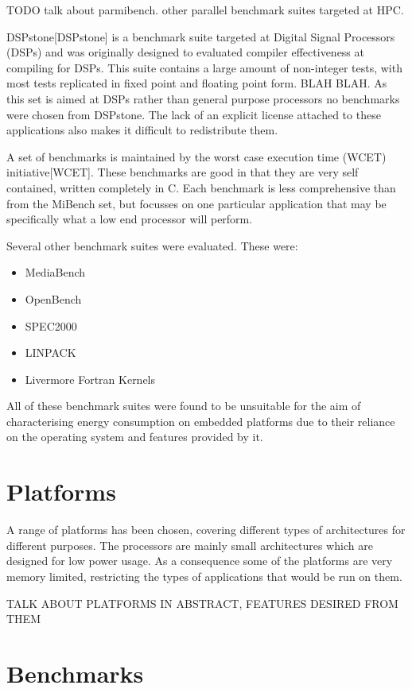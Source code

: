 \documentclass[twocolumn]{article}
\begin{document}
TODO talk about parmibench. other parallel
benchmark suites targeted at HPC.

DSPstone[DSPstone] is a benchmark suite targeted at Digital Signal Processors (DSPs) and was originally designed to evaluated compiler effectiveness at compiling for DSPs. This suite contains a large amount of non-integer tests, with most tests replicated in fixed point and floating point form. BLAH BLAH. As this set is aimed at DSPs rather than general purpose processors no benchmarks were chosen from DSPstone. The lack of an explicit license attached to these applications also makes it difficult to redistribute them.

A set of benchmarks is maintained by the worst case execution time (WCET) initiative[WCET]. These benchmarks are good in that they are very self contained, written completely in C. Each benchmark is less comprehensive than from the MiBench set, but focusses on one particular application that may be specifically what a low end processor will perform.

Several other benchmark suites were evaluated. These were:
\begin{itemize}
	\item MediaBench
	\item OpenBench\cite{OpenBench}
	\item SPEC2000\cite{SPEC2000}
	\item LINPACK
	\item Livermore Fortran Kernels
\end{itemize}

All of these benchmark suites were found to be unsuitable for the aim of characterising energy consumption on embedded platforms due to their reliance on the operating system and features provided by it.

\section*{Platforms}

A range of platforms has been chosen, covering different types of architectures for different purposes. The processors are mainly small architectures which are designed for low power usage. As a consequence some of the platforms are very memory limited, restricting the types of applications that would be run on them.

TALK ABOUT PLATFORMS IN ABSTRACT, FEATURES DESIRED FROM THEM

\section*{Benchmarks}
\end{document}
